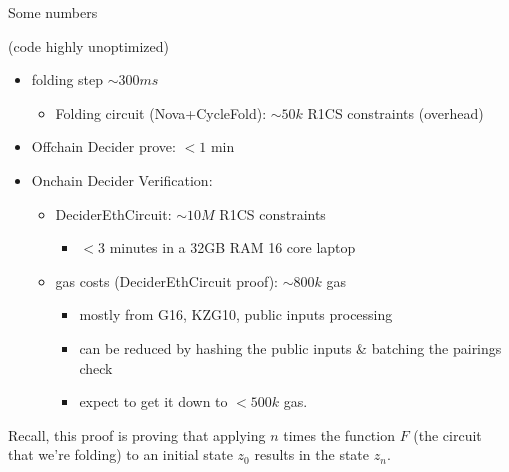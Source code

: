 \documentclass[t]{beamer} \usefonttheme[onlymath]{serif}
\begin{document}
\begin{frame}{Some numbers}
  \footnotesize{
  (code highly unoptimized)
  \begin{itemize}
    \item folding step $\sim 300 ms$
      \begin{itemize}
      \item Folding circuit (Nova+CycleFold): $\sim 50k$ R1CS constraints (overhead)
      \end{itemize}
    \item Offchain Decider prove: $< 1$ min
    \item Onchain Decider Verification:
    \begin{itemize}
      \item DeciderEthCircuit: $\sim 10M$ R1CS constraints
      \begin{itemize}
        \item $<3$ minutes in a 32GB RAM 16 core laptop
      \end{itemize}
      \item gas costs (DeciderEthCircuit proof): $\sim 800k$ gas
      \begin{itemize}
        \item mostly from G16, KZG10, public inputs processing
        \item can be reduced by hashing the public inputs \& batching the pairings check
        \item expect to get it down to $< 500k$ gas.
      \end{itemize}
    \end{itemize}
  \end{itemize}
  }

  \vspace{0.6cm}

  Recall, this proof is proving that applying $n$ times the function $F$ (the circuit that we're folding) to an initial state $z_0$ results in the state $z_n$.
\end{frame}
\end{document}
